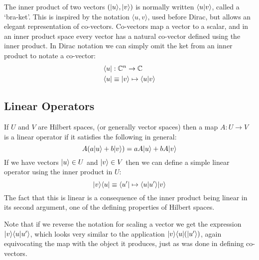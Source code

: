 The inner product of two vectors $(| u \rangle, | v \rangle)$ is normally written $\langle u | v \rangle$, called a `bra-ket'. This is inspired by the notation $\langle u, v\rangle$, used before Dirac, but allows an elegant representation of co-vectors. Co-vectors map a vector to a scalar, and in an inner product space every vector has a natural co-vector defined using the inner product. In Dirac notation we can simply omit the ket from an inner product to notate a co-vector:
\begin{align*}
	\langle u | &: \mathbb{C}^n \to \mathbb{C}
	\\\langle u | &\equiv | v \rangle \mapsto \langle u | v \rangle
\end{align*}

\subsection{Linear Operators}
If $U$ and $V$ are Hilbert spaces, (or generally vector spaces) then a map $A: U \to V$ is a linear operator if it satisfies the following in general:
\[A(a| u \rangle + b| v \rangle) = aA| u \rangle + bA| v \rangle\]
If we have vectors $| u \rangle \in U$ and $| v \rangle \in V$ then we can define a simple linear operator using the inner product in $U$:
\[| v \rangle\langle u | \equiv \langle u' | \mapsto \langle u | u' \rangle| v \rangle\]
The fact that this is linear is a consequence of the inner product being linear in its second argument, one of the defining properties of Hilbert spaces.

Note that if we reverse the notation for scaling a vector we get the expression $| v \rangle\langle u | u' \rangle$, which looks very similar to the application $| v \rangle\langle u |(| u' \rangle)$, again equivocating the map with the object it produces, just as was done in defining co-vectors.


